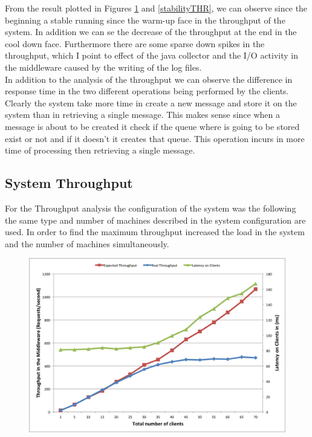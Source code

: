 From the result plotted in Figures \ref{through} and \ref{stabilityTHR}, we can observe since the beginning a stable running since the warm-up face in the throughput of the system. In addition we can se the decrease of the throughput at the end in the cool down face. Furthermore there are some sparse down spikes in the throughput, which I point to effect of the java collector and the I/O activity in the middleware caused by the writing of the log files.\\

In addition to the analysis of the throughput we can observe the difference in response time in the two different operations being performed by the clients. Clearly the system take more time in create a new message and store it on the system than in retrieving a single message. This makes sense since when a message is about to be created it check if the queue where is going to be stored exist or not and if it doesn’t it creates that queue. This operation incurs in more time of processing then retrieving a single message.


\subsection{System Throughput}\label{sec:system-throughput}
For the Throughput analysis the configuration of the system was the following the same type and number of machines described in the system configuration are used. In order to find the maximum throughput increased the load in the system and the number of machines simultaneously.
\begin{figure}[h!]
	\centering
	\includegraphics[scale=0.4]{through.png}
	\caption{}
	\label{through}
\end{figure}

